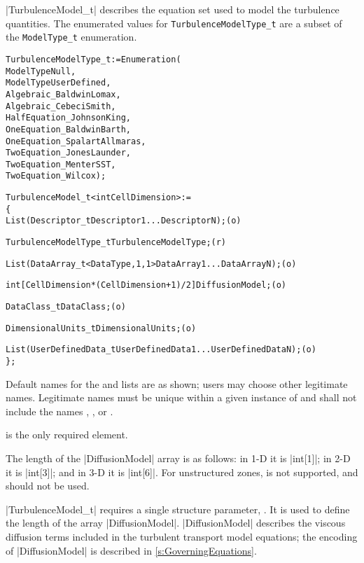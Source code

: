 |TurbulenceModel\_t| describes the equation set used to model the
turbulence quantities.
The enumerated values for \texttt{TurbulenceModelType\_t} are a subset of the
\texttt{ModelType\_t} enumeration.
\begin{alltt}
  TurbulenceModelType\_t := Enumeration(
    ModelTypeNull,
    ModelTypeUserDefined,
    Algebraic\_BaldwinLomax,
    Algebraic\_CebeciSmith,
    HalfEquation\_JohnsonKing,
    OneEquation\_BaldwinBarth,
    OneEquation\_SpalartAllmaras,
    TwoEquation\_JonesLaunder,
    TwoEquation\_MenterSST,
    TwoEquation\_Wilcox ) ;

  TurbulenceModel\_t< int CellDimension > :=
    \{
    List( Descriptor\_t Descriptor1 ... DescriptorN ) ;                      (o)

    TurbulenceModelType\_t TurbulenceModelType ;                             (r)
    
    List( DataArray\_t<DataType, 1, 1> DataArray1 ... DataArrayN ) ;         (o)

    int[CellDimension*(CellDimension + 1)/2] DiffusionModel ;               (o)

    DataClass\_t DataClass ;                                                 (o)
                
    DimensionalUnits\_t DimensionalUnits ;                                   (o)

    List( UserDefinedData\_t UserDefinedData1 ... UserDefinedDataN ) ;       (o)
    \} ;
\end{alltt}

\begin{notes}
\item
 Default names for the  and 
 lists are as shown; users may choose other legitimate names.
 Legitimate names must be unique within a given instance of
  and shall not include the names
 , , or .
\item
  is the only required element.
\item
 The length of the |DiffusionModel| array is as follows: in 1-D it is
 |int[1]|; in 2-D it is |int[3]|; and in 3-D it is |int[6]|.
 For unstructured zones,  is not supported, and
 should not be used.
\end{notes}

|TurbulenceModel_t| requires a single structure parameter,
.
It is used to define the length of the array |DiffusionModel|.
|DiffusionModel| describes the viscous diffusion terms included in the
turbulent transport model equations; the encoding of |DiffusionModel| is
described in \autoref{s:GoverningEquations}.

